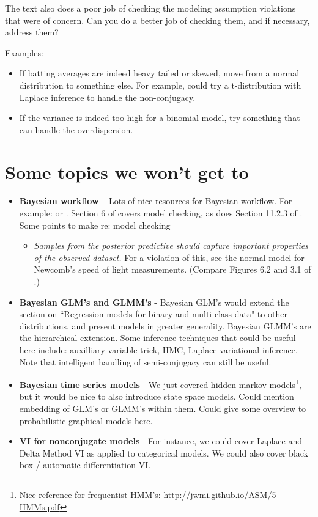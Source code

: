 \documentclass{article} %
\begin{document}
The text also does a poor job of checking the modeling assumption violations that were of concern.   Can you do a better job of checking them,  and if necessary,  address them?

Examples:
\begin{itemize}
\item If batting averages are indeed heavy tailed or skewed,  move from a normal distribution to something else.   For example,  could try a t-distribution with Laplace inference to handle the non-conjugacy. 
\item If the variance is indeed too high for a binomial model,  try something that can handle the overdispersion. 
\end{itemize}

\section{Some topics we won't get to}

\begin{itemize}
\item \textbf{Bayesian workflow} -- Lots of nice resources for Bayesian workflow.    For example: \cite{gelman2020bayesian} or \cite{gabry2019visualization}.   Section 6 of \cite{gelman2013bayesian} covers model checking,  as does  Section 11.2.3 of \cite{davison2003statistical}.    Some points to make re: model checking
	\begin{itemize}
	\item \textit{Samples from the posterior predictive should capture important properties of the observed dataset.}  For a violation of this,  see the normal model for Newcomb's speed of light measurements.  (Compare Figures 6.2 and 3.1 of \cite{gelman2013bayesian}.)
	\end{itemize}
\item \textbf{Bayesian GLM's and GLMM's} - Bayesian GLM's would extend the section on ``Regression models for binary and multi-class data" to other distributions, and present models in greater generality.  Bayesian GLMM's are the hierarchical extension.  Some inference techniques that could be useful here include:  auxilliary variable trick, HMC, Laplace variational inference. Note that intelligent handling of semi-conjugacy can still be useful.
\item \textbf{Bayesian time series models} -  We just covered hidden markov models\footnote{Nice reference for frequentist HMM's: \url{http://jwmi.github.io/ASM/5-HMMs.pdf}}, but it would be nice to also introduce state space models.    Could mention embedding of GLM's or GLMM's within them.   Could give some overview to probabilistic graphical models here. 
\item \textbf{VI for nonconjugate models} - For instance, we could cover Laplace and Delta Method VI as applied to categorical models.   We could also cover black box / automatic differentiation VI.
\end{itemize}
\end{document}
